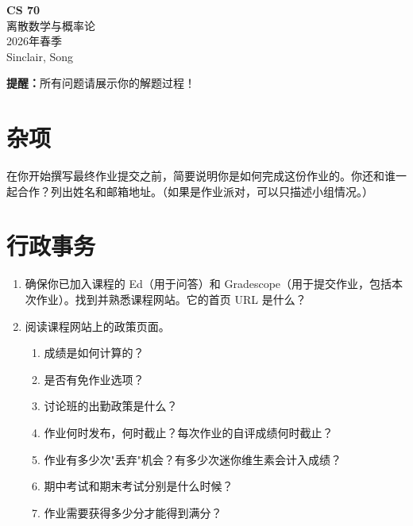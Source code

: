 \documentclass[11pt,a4paper]{article}
\begin{document}
\begin{center}
    {\Large\bfseries CS 70}\\[0.3em]
    {\large 离散数学与概率论}\\[0.2em]
    2026年春季\\[0.2em]
    Sinclair, Song\\[1em]
\end{center}

\begin{tcolorbox}[colback=yellow!10,colframe=yellow!50!black]
    \textbf{提醒：}所有问题请展示你的解题过程！
\end{tcolorbox}

\section*{杂项}

在你开始撰写最终作业提交之前，简要说明你是如何完成这份作业的。你还和谁一起合作？列出姓名和邮箱地址。（如果是作业派对，可以只描述小组情况。）

\section{行政事务}

\begin{enumerate}[label=(\alph*)]
    \item 确保你已加入课程的 Ed（用于问答）和 Gradescope（用于提交作业，包括本次作业）。找到并熟悉课程网站。它的首页 URL 是什么？
    \item 阅读课程网站上的政策页面。
    \begin{enumerate}[label=(\roman*)]
        \item 成绩是如何计算的？
        \item 是否有免作业选项？
        \item 讨论班的出勤政策是什么？
        \item 作业何时发布，何时截止？每次作业的自评成绩何时截止？
        \item 作业有多少次"丢弃"机会？有多少次迷你维生素会计入成绩？
        \item 期中考试和期末考试分别是什么时候？
        \item 作业需要获得多少分才能得到满分？
    \end{enumerate}
\end{enumerate}
\end{document}
